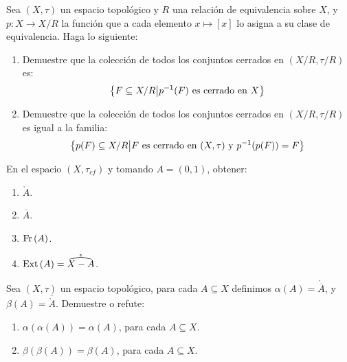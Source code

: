 \documentclass[12pt]{report}
\theoremstyle{largebreak}
\newcommand\cf[3]{\ensuremath{#1:#2\rightarrow#3}}
\newcommand{\Int}[1]{\ensuremath{\mathring{#1}}}
\newcommand{\Cls}[1]{\ensuremath{\overline{#1}}}
\newcommand{\Fr}[1]{\ensuremath{\textup{Fr}\left(#1\right)}}
\newcommand{\Ext}[1]{\ensuremath{\textup{Ext}\left(#1\right)}}
\begin{document}
    \begin{excer}
        Sea $(X,\tau)$ un espacio topológico y $R$ una relación de equivalencia sobre $X$, y $\cf{p}{X}{X/R}$ la función que a cada elemento $x\mapsto [x]$ lo asigna a su clase de equivalencia. Haga lo siguiente:
        \begin{enumerate}
            \item Demuestre que la colección de todos los conjuntos cerrados en $(X/R,\tau/R)$ es:
            \begin{equation*}
                \left\{F\subseteq X/R\big| p^{-1}(F) \textup{ es cerrado en }X \right\}
            \end{equation*}
            \item Demuestre que la colección de todos los conjuntos cerrados en $(X/R, \tau/R)$ es igual a la familia:
            \begin{equation*}
                \left\{p(F)\subseteq X/R\big| F\textup{ es cerrado en }(X,\tau)\textup{ y }p^{-1}(p(F))=F \right\}
            \end{equation*}
        \end{enumerate}
    \end{excer}

    \begin{sol}
        
    \end{sol}

    \begin{excer}
        En el espacio $(X,\tau_{cf})$ y tomando $A=(0,1)$, obtener:
        \begin{enumerate}
            \item $\Int{A}$.
            \item $\Cls{A}$.
            \item $\Fr{A}$.
            \item $\Ext{A}=\Int{\widehat{X-A}}$.
        \end{enumerate}
    \end{excer}

    \begin{sol}
        
    \end{sol}

    \begin{excer}
        Sea $(X,\tau)$ un espacio topológico, para cada $A\subseteq X$ definimos $\alpha(A)=\Int{\Cls{A}}$, y $\beta(A)=\Cls{\Int{A}}$. Demuestre o refute:
        \begin{enumerate}
            \item $\alpha(\alpha(A))=\alpha(A)$, para cada $A\subseteq X$.
            \item $\beta(\beta(A))=\beta(A)$, para cada $A\subseteq X$.
        \end{enumerate}
    \end{excer}
\end{document}
